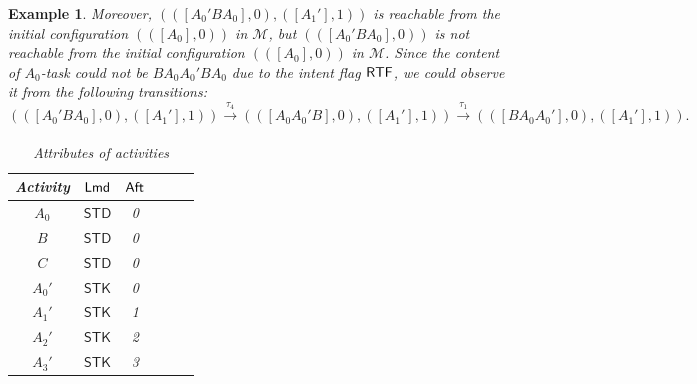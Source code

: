 \documentclass[preprint,12pt]{elsarticle}
\newtheorem{example}{Example}
\newcommand\Mm{{\mathcal{M} }}
\newcommand\aft{{\sf Aft}}
\newcommand\lmd{{\sf Lmd}}
\newcommand\rtfflag{{\sf RTF}}
\newcommand{\STK}{\mathsf{STK}}
\newcommand{\STD}{\mathsf{STD}}
\begin{document}
{\begin{example}
Moreover, $(([A_0'BA_0],0),([A_1'],1))$ is reachable from the initial configuration $(([A_0],0))$ in $\Mm$, but $(([A_0'BA_0],0))$ is not reachable from the initial configuration $(([A_0],0))$ in $\Mm$. Since the content of $A_0$-task could not be $BA_0A_0'BA_0$ due to the intent flag $\rtfflag$, we could observe it from the following transitions:
$$(([A_0'BA_0],0),([A_1'],1))\xrightarrow[]{\tau_4}(([A_0A_0'B],0),([A_1'],1))\xrightarrow[]{\tau_1}(([BA_0A_0'],0),([A_1'],1)).$$
\begin{table}[htbp]
	\begin{center}
	\begin{tabular}{|c|c|c|c|c|c|}
	\hline
	Activity & $\lmd$ & $\aft$\\
	\hline
	$A_0$ & $\STD$ & 0\\
	\hline
	$B$ & $\STD$ & 0 \\
	\hline
	$C$ & $\STD$ & 0 \\
	\hline
	$A_0'$ & $\STK$ & 0 \\
	\hline
	$A_1'$ & $\STK$ & 1 \\
	\hline
	$A_2'$ & $\STK$ & 2 \\
	\hline
	$A_3'$ & $\STK$ & 3 \\
	\hline
	\end{tabular}
	\caption{Attributes of activities}
	\label{tab-attribute-nostk}
	\end{center}
\end{table}
\end{example}
}
\end{document}
